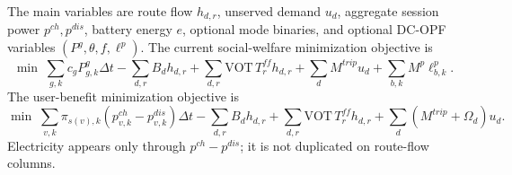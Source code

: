 The main variables are route flow \(h_{d,r}\), unserved demand \(u_d\),
aggregate session power \(p^{ch},p^{dis}\), battery energy \(e\), optional
mode binaries, and optional DC-OPF variables \((P^g,\theta,f,\ell^p)\). The
current social-welfare minimization objective is
\begin{equation}
  \min\;\sum_{g,k}c_g P^g_{g,k}\Delta t
      -\sum_{d,r} B_d h_{d,r}
      +\sum_{d,r} \mathrm{VOT}\,T^{ff}_{r}h_{d,r}
      +\sum_d M^{trip}u_d
      +\sum_{b,k}M^p\ell^p_{b,k}.
  \label{eq:evpt-d-social-objective}
\end{equation}
The user-benefit minimization objective is
\begin{equation}
  \min\;\sum_{v,k}\pi_{s(v),k}\left(p^{ch}_{v,k}-p^{dis}_{v,k}\right)\Delta t
      -\sum_{d,r} B_dh_{d,r}
      +\sum_{d,r}\mathrm{VOT}\,T^{ff}_{r}h_{d,r}
      +\sum_d\left(M^{trip}+\Omega_d\right)u_d.
  \label{eq:evpt-d-user-objective}
\end{equation}
Electricity appears only through \(p^{ch}-p^{dis}\); it is not duplicated on
route-flow columns.

